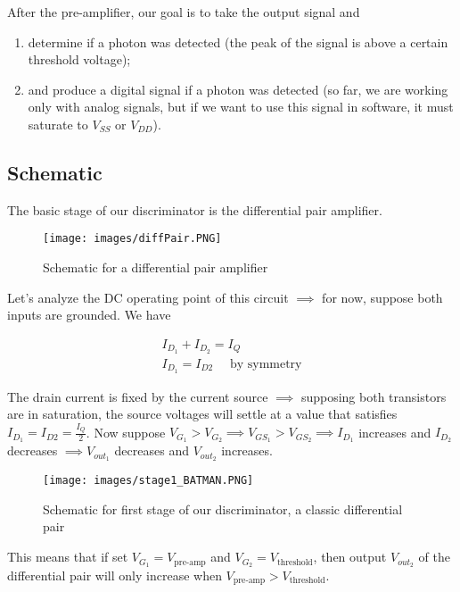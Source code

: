 \documentclass[a4paper,12pt,twoside]{article}
\begin{document}
	After the pre-amplifier, our goal is to take the output signal and
	\begin{enumerate}
		\item determine if a photon was detected (the peak of the signal is above a certain threshold voltage);
		\item and produce a digital signal if a photon was detected (so far, we are working only with analog signals, but if we want to use this signal in software, it must saturate to $V_{SS}$ or $V_{DD}$).
	\end{enumerate}
	
	\subsection{Schematic}
	
	The basic stage of our discriminator is the differential pair amplifier.
	
	\begin{figure}[h!]
		\centering
		\texttt{[image: images/diffPair.PNG]}
		\label{diffPair}
		\caption{Schematic for a differential pair amplifier\cite{CurrentS}}
	\end{figure}
	
	Let's analyze the DC operating point of this circuit $\implies$ for now, suppose both inputs are grounded. We have
	
	\begin{align}
		I_{D_1} + I_{D_2} = I_Q \\
		I_{D_1} = I_{D2} \quad \text{ by symmetry}
	\end{align}
	
	The drain current is fixed by the current source $\implies$ supposing both transistors are in saturation, the source voltages will settle at a value that satisfies $I_{D_1} = I_{D2} = \frac{I_Q}{2}$. Now suppose $V_{G_1} > V_{G_2} \implies V_{GS_1} > V_{GS_2} \implies I_{D_1}$ increases and $I_{D_2}$ decreases $\implies V_{out_1}$ decreases and $V_{out_2}$ increases.
	
	\begin{figure}[h!]
		\centering
		\texttt{[image: images/stage1\_BATMAN.PNG]}
		\label{diffPairBATMAN}
		\caption{Schematic for first stage of our discriminator, a classic differential pair}
	\end{figure}
	
	This means that if set $V_{G_1} = V_{\text{pre-amp}}$ and $V_{G_2} = V_{\text{threshold}}$, then output $V_{out_2}$ of the differential pair will only increase when $V_{\text{pre-amp}} > V_{\text{threshold}}$.
	
\end{document}
